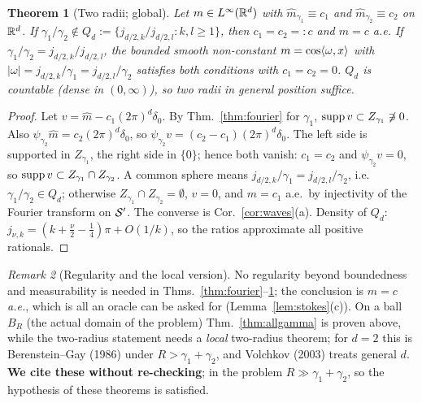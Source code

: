 \documentclass[11pt,a4paper]{article}
\numberwithin{equation}{section}
\newtheorem{theorem}{Theorem}[section]
\theoremstyle{definition}
\theoremstyle{remark}
\newtheorem{remark}[theorem]{Remark}
\begin{document}
\begin{theorem}[Two radii; global]\label{thm:tworadii}
Let $m\in L^\infty(\mathbb R^d)$ with $\hat m_{\gamma_1}\equiv c_1$ and $\hat m_{\gamma_2}\equiv c_2$ on $\mathbb R^d$. If $\gamma_1/\gamma_2\notin Q_d:=\{j_{d/2,k}/j_{d/2,l}:k,l\ge1\}$, then $c_1=c_2=:c$ and $m=c$ a.e. If $\gamma_1/\gamma_2=j_{d/2,k}/j_{d/2,l}$, the bounded smooth non-constant $m=\cos\langle \omega,x\rangle$ with $|\omega|=j_{d/2,k}/\gamma_1=j_{d/2,l}/\gamma_2$ satisfies both conditions with $c_1=c_2=0$. $Q_d$ is countable (dense in $(0,\infty)$), so two radii in general position suffice.
\end{theorem}
\begin{proof}
Let $v=\hat m-c_1(2\pi)^d\delta_0$. By Thm.~\ref{thm:fourier} for $\gamma_1$, $\operatorname{supp} v\subset Z_{\gamma_1}\not\ni0$. Also $\psi_{\gamma_2}\hat m=c_2(2\pi)^d\delta_0$, so $\psi_{\gamma_2}v=(c_2-c_1)(2\pi)^d\delta_0$. The left side is supported in $Z_{\gamma_1}$, the right side in $\{0\}$; hence both vanish: $c_1=c_2$ and $\psi_{\gamma_2}v=0$, so $\operatorname{supp} v\subset Z_{\gamma_1}\cap Z_{\gamma_2}$. A common sphere means $j_{d/2,k}/\gamma_1=j_{d/2,l}/\gamma_2$, i.e.\ $\gamma_1/\gamma_2\in Q_d$; otherwise $Z_{\gamma_1}\cap Z_{\gamma_2}=\emptyset$, $v=0$, and $m=c_1$ a.e.\ by injectivity of the Fourier transform on $\mathcal S'$. The converse is Cor.~\ref{cor:waves}(a). Density of $Q_d$: $j_{\nu,k}=(k+\frac\nu2-\frac14)\pi+O(1/k)$, so the ratios approximate all positive rationals.
\end{proof}

\begin{remark}[Regularity and the local version]
No regularity beyond boundedness and measurability is needed in Thms.~\ref{thm:fourier}--\ref{thm:tworadii}; the conclusion is $m=c$ \emph{a.e.}, which is all an oracle can be asked for (Lemma~\ref{lem:stokes}(c)). On a ball $B_R$ (the actual domain of the problem) Thm.~\ref{thm:allgamma} is proven above, while the two-radius statement needs a \emph{local} two-radius theorem; for $d=2$ this is Berenstein--Gay (1986) under $R>\gamma_1+\gamma_2$, and Volchkov (2003) treats general $d$. \textbf{We cite these without re-checking}; in the problem $R\gg\gamma_1+\gamma_2$, so the hypothesis of these theorems is satisfied.
\end{remark}
\end{document}
